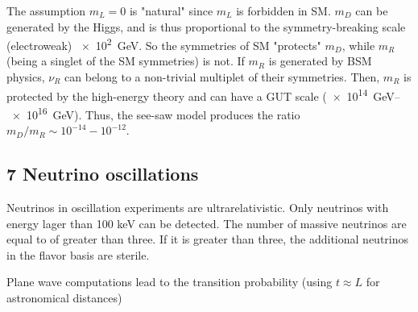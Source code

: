 \documentclass[twocolumn]{article}
\begin{document}
The assumption $m_L = 0$ is "natural" since $m_L$ is forbidden in SM. $m_D$ can be generated by the Higgs, and is thus proportional to the symmetry-breaking scale (electroweak) \SI{e2}{GeV}. So the symmetries of SM "protects" $m_D$, while $m_R$ (being a singlet of the SM symmetries) is not. If $m_R$ is generated by BSM physics, $\nu_R$ can belong to a non-trivial multiplet of their symmetries. Then, $m_R$ is protected by the high-energy theory and can have a GUT scale (\SIrange{e14}{e16}{GeV}). Thus, the see-saw model produces the ratio $m_D/m_R \sim 10^{-14}-10^{-12}$. 

\subsection*{7 Neutrino oscillations}
Neutrinos in oscillation experiments are ultrarelativistic. Only neutrinos with energy lager than 100 keV can be detected.
The number of massive neutrinos are equal to of greater than three. If it is greater than three, the additional neutrinos in the flavor basis are sterile. 

Plane wave computations lead to the transition probability (using $t \approx L$ for astronomical distances)
\end{document}
